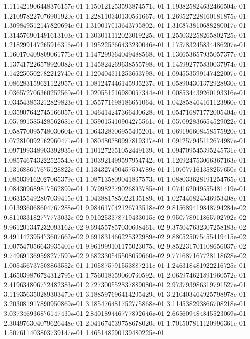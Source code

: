 1.111421906448376157e-01
1.150121253593874571e-01
1.193825824632466504e-01
1.210978227076901920e-01
1.228110340130561667e-01
1.269527228160181875e-01
1.309849512147820694e-01
1.310017013643795802e-01
1.310873810688280017e-01
1.314576901491613103e-01
1.303011112023019225e-01
1.255032258265802725e-01
1.218299147265916316e-01
1.195225366433230046e-01
1.175783245834486207e-01
1.160170409809061776e-01
1.147299364049488568e-01
1.136653657935057377e-01
1.137417226578920082e-01
1.145824269638555798e-01
1.145992775830037974e-01
1.142250502782212740e-01
1.120404311253663798e-01
1.094553599147422007e-01
1.086283159621122957e-01
1.081247446145935237e-01
1.058904301372928930e-01
1.036572706360252560e-01
1.020551216980067344e-01
1.008534439260193316e-01
1.034543853212829823e-01
1.055771698186651064e-01
1.042858464161123960e-01
1.035907642745166057e-01
1.046414247366430628e-01
1.054716871772005404e-01
1.057891585428562681e-01
1.059015410904275561e-01
1.057092836654529022e-01
1.058770095748030604e-01
1.064328306955405201e-01
1.069196608458575920e-01
1.072810092162960471e-01
1.080480380997819317e-01
1.091257945112674987e-01
1.097199348903392935e-01
1.101272351052449139e-01
1.094709545395245731e-01
1.085746743222525540e-01
1.103921499597954742e-01
1.126924753066367163e-01
1.131688617675128822e-01
1.134327490457594789e-01
1.107077161358257650e-01
1.085039162027065379e-01
1.087135809041867573e-01
1.088033628191254765e-01
1.084309689817562899e-01
1.079982379026893785e-01
1.074162049555481419e-01
1.063155492807039415e-01
1.043881785022135189e-01
1.027446824546953408e-01
1.013936068604767288e-01
9.984617042126793518e-02
9.815689419848794284e-02
9.811033182777773032e-02
9.910253378719433015e-02
9.950778911865702792e-02
9.961201347232093162e-02
9.694557857030608461e-02
9.375047632307258183e-02
9.491142395473607662e-02
9.691831466225322989e-02
9.880525075455419415e-02
1.007547056643935401e-01
9.961999101175023075e-02
9.852231701108656037e-02
9.749691369598277590e-02
9.682330545508059660e-02
9.771687167728118628e-02
1.005456737508863552e-01
1.105875791553887211e-01
1.246318481922216725e-01
1.465039876724312795e-01
1.756018359060760592e-01
2.065974621891960572e-01
2.419634806772482383e-01
2.727300552837889080e-01
2.973793986319791527e-01
3.119356350289303470e-01
3.188597696414205429e-01
3.210403464925798978e-01
3.203081917890950869e-01
3.185476481752775868e-01
3.114538293866708218e-01
3.037346936876147430e-01
2.840189446777892646e-01
2.665609484845523069e-01
2.304976304079626448e-01
2.041674539758678020e-01
1.701507811120996361e-01
1.507611403803739147e-01
1.465148290139480225e-01
